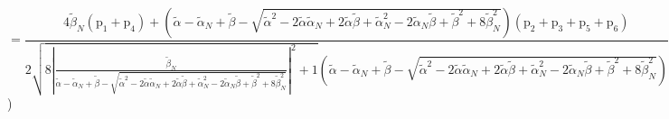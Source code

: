 \documentclass[12pt,a4paper]{article}
\begin{document}
\begin{itemize}
$$ $$ $$ = \frac{4 \tilde{\beta}_{N} \left(\text{p}_{1} + \text{p}_{4}\right) + \left(\tilde{\alpha} - \tilde{\alpha}_{N} + \tilde{\beta} - \sqrt{\tilde{\alpha}^{2} - 2 \tilde{\alpha} \tilde{\alpha}_{N} + 2 \tilde{\alpha} \tilde{\beta} + \tilde{\alpha}_{N}^{2} - 2 \tilde{\alpha}_{N} \tilde{\beta} + \tilde{\beta}^{2} + 8 \tilde{\beta}_{N}^{2}}\right) \left(\text{p}_{2} + \text{p}_{3} + \text{p}_{5} + \text{p}_{6}\right)}{2 \sqrt{8 \left|{\frac{\tilde{\beta}_{N}}{\tilde{\alpha} - \tilde{\alpha}_{N} + \tilde{\beta} - \sqrt{\tilde{\alpha}^{2} - 2 \tilde{\alpha} \tilde{\alpha}_{N} + 2 \tilde{\alpha} \tilde{\beta} + \tilde{\alpha}_{N}^{2} - 2 \tilde{\alpha}_{N} \tilde{\beta} + \tilde{\beta}^{2} + 8 \tilde{\beta}_{N}^{2}}}}\right|^{2} + 1} \left(\tilde{\alpha} - \tilde{\alpha}_{N} + \tilde{\beta} - \sqrt{\tilde{\alpha}^{2} - 2 \tilde{\alpha} \tilde{\alpha}_{N} + 2 \tilde{\alpha} \tilde{\beta} + \tilde{\alpha}_{N}^{2} - 2 \tilde{\alpha}_{N} \tilde{\beta} + \tilde{\beta}^{2} + 8 \tilde{\beta}_{N}^{2}}\right)} 
 $$ 
 )


\end{itemize}
\end{document}
